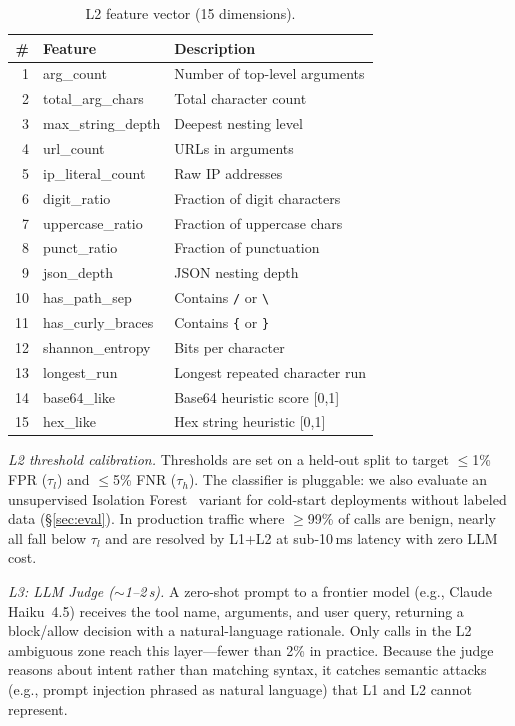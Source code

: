\documentclass[sigconf]{acmart}
\begin{document}
\begin{table}[t]
\centering
\footnotesize
\caption{L2 feature vector (15 dimensions).}
\vspace{-0.1in}
\label{tab:features}
\setlength{\tabcolsep}{3pt}
\begin{tabular}{rll}
\toprule
\# & Feature & Description \\
\midrule
1 & arg\_count & Number of top-level arguments \\
2 & total\_arg\_chars & Total character count \\
3 & max\_string\_depth & Deepest nesting level \\
4 & url\_count & URLs in arguments \\
5 & ip\_literal\_count & Raw IP addresses \\
6 & digit\_ratio & Fraction of digit characters \\
7 & uppercase\_ratio & Fraction of uppercase chars \\
8 & punct\_ratio & Fraction of punctuation \\
9 & json\_depth & JSON nesting depth \\
10 & has\_path\_sep & Contains \texttt{/} or \texttt{\textbackslash} \\
11 & has\_curly\_braces & Contains \texttt{\{} or \texttt{\}} \\
12 & shannon\_entropy & Bits per character \\
13 & longest\_run & Longest repeated character run \\
14 & base64\_like & Base64 heuristic score [0,1] \\
15 & hex\_like & Hex string heuristic [0,1] \\
\bottomrule
\end{tabular}
\vspace{-0.15in}
\end{table}

\emph{L2 threshold calibration.}
Thresholds are set on a held-out split to target $\le$1\% FPR ($\tau_l$) and $\le$5\% FNR ($\tau_h$).
The classifier is pluggable: we also evaluate an unsupervised Isolation Forest~\cite{zhao2019pyod} variant for cold-start deployments without labeled data (\S\ref{sec:eval}).
In production traffic where ${\ge}$99\% of calls are benign, nearly all fall below $\tau_l$ and are resolved by L1+L2 at sub-10\,ms latency with zero LLM cost.

\emph{L3: LLM Judge ($\sim$1--2\,s).}
A zero-shot prompt to a frontier model (e.g., Claude Haiku~4.5) receives the tool name, arguments, and user query, returning a block/allow decision with a natural-language rationale. Only calls in the L2 ambiguous zone reach this layer---fewer than 2\% in practice.
Because the judge reasons about intent rather than matching syntax, it catches semantic attacks (e.g., prompt injection phrased as natural language) that L1 and L2 cannot represent.
\end{document}
